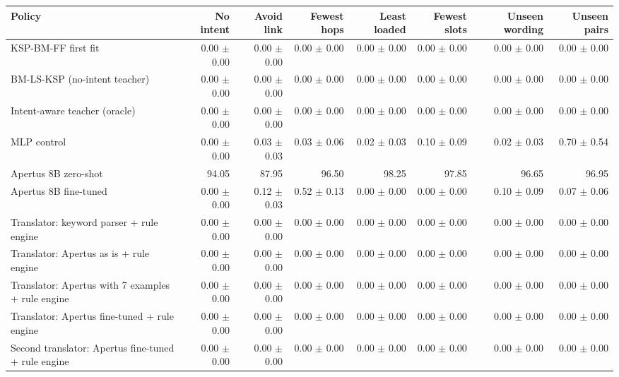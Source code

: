 \begin{tabular}{lrrrrrrr}
\toprule
Policy & No intent & Avoid link & Fewest hops & Least loaded & Fewest slots & Unseen wording & Unseen pairs \\
\midrule
KSP-BM-FF first fit & 0.00 $\pm$ 0.00 & 0.00 $\pm$ 0.00 & 0.00 $\pm$ 0.00 & 0.00 $\pm$ 0.00 & 0.00 $\pm$ 0.00 & 0.00 $\pm$ 0.00 & 0.00 $\pm$ 0.00 \\
BM-LS-KSP (no-intent teacher) & 0.00 $\pm$ 0.00 & 0.00 $\pm$ 0.00 & 0.00 $\pm$ 0.00 & 0.00 $\pm$ 0.00 & 0.00 $\pm$ 0.00 & 0.00 $\pm$ 0.00 & 0.00 $\pm$ 0.00 \\
Intent-aware teacher (oracle) & 0.00 $\pm$ 0.00 & 0.00 $\pm$ 0.00 & 0.00 $\pm$ 0.00 & 0.00 $\pm$ 0.00 & 0.00 $\pm$ 0.00 & 0.00 $\pm$ 0.00 & 0.00 $\pm$ 0.00 \\
MLP control & 0.00 $\pm$ 0.00 & 0.03 $\pm$ 0.03 & 0.03 $\pm$ 0.06 & 0.02 $\pm$ 0.03 & 0.10 $\pm$ 0.09 & 0.02 $\pm$ 0.03 & 0.70 $\pm$ 0.54 \\
Apertus 8B zero-shot & 94.05 & 87.95 & 96.50 & 98.25 & 97.85 & 96.65 & 96.95 \\
Apertus 8B fine-tuned & 0.00 $\pm$ 0.00 & 0.12 $\pm$ 0.03 & 0.52 $\pm$ 0.13 & 0.00 $\pm$ 0.00 & 0.00 $\pm$ 0.00 & 0.10 $\pm$ 0.09 & 0.07 $\pm$ 0.06 \\
Translator: keyword parser + rule engine & 0.00 $\pm$ 0.00 & 0.00 $\pm$ 0.00 & 0.00 $\pm$ 0.00 & 0.00 $\pm$ 0.00 & 0.00 $\pm$ 0.00 & 0.00 $\pm$ 0.00 & 0.00 $\pm$ 0.00 \\
Translator: Apertus as is + rule engine & 0.00 $\pm$ 0.00 & 0.00 $\pm$ 0.00 & 0.00 $\pm$ 0.00 & 0.00 $\pm$ 0.00 & 0.00 $\pm$ 0.00 & 0.00 $\pm$ 0.00 & 0.00 $\pm$ 0.00 \\
Translator: Apertus with 7 examples + rule engine & 0.00 $\pm$ 0.00 & 0.00 $\pm$ 0.00 & 0.00 $\pm$ 0.00 & 0.00 $\pm$ 0.00 & 0.00 $\pm$ 0.00 & 0.00 $\pm$ 0.00 & 0.00 $\pm$ 0.00 \\
Translator: Apertus fine-tuned + rule engine & 0.00 $\pm$ 0.00 & 0.00 $\pm$ 0.00 & 0.00 $\pm$ 0.00 & 0.00 $\pm$ 0.00 & 0.00 $\pm$ 0.00 & 0.00 $\pm$ 0.00 & 0.00 $\pm$ 0.00 \\
Second translator: Apertus fine-tuned + rule engine & 0.00 $\pm$ 0.00 & 0.00 $\pm$ 0.00 & 0.00 $\pm$ 0.00 & 0.00 $\pm$ 0.00 & 0.00 $\pm$ 0.00 & 0.00 $\pm$ 0.00 & 0.00 $\pm$ 0.00 \\
\bottomrule
\end{tabular}

